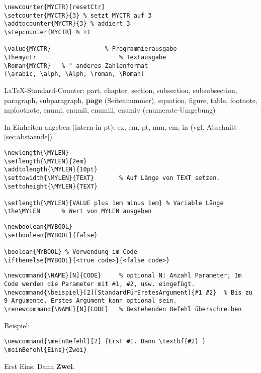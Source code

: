 
\columnbreak
{}



\negAbstand
\begin{lstlisting}
\newcounter{MYCTR}[resetCtr]
\setcounter{MYCTR}{3} % setzt MYCTR auf 3
\addtocounter{MYCTR}{3} % addiert 3
\stepcounter{MYCTR}	% +1

\value{MYCTR}				% Programmierausgabe
\themyctr						% Textausgabe
\Roman{MYCTR}	% " anderes Zahlenformat 
(\arabic, \alph, \Alph, \roman, \Roman)
\end{lstlisting}
\LaTeX-Standard-Counter: part, chapter, section, subsection, subsubsection, paragraph, subparagraph, \textbf{page} (Seitennummer), equation, figure, table, footnote, mpfootnote, enumi, enumii, enumiii, enumiv (enumerate-Umgebung)

\bigskip


 \label{cha:Laengen}
In Einheiten angeben (intern in pt): ex, em, pt, mm, cm, in (vgl. Abschnitt \ref{sec:abstaende})
\begin{lstlisting}
\newlength{\MYLEN}
\setlength{\MYLEN}{2em}
\addtolength{\MYLEN}{10pt}
\settowidth{\MYLEN}{TEXT}		% Auf Länge von TEXT setzen.
\settoheight{\MYLEN}{TEXT}	

\setlength{\MYLEN}{VALUE plus 1em minus 1em} % Variable Länge
\the\MYLEN		% Wert von MYLEN ausgeben
\end{lstlisting}


\begin{lstlisting}
\newboolean{MYBOOL}
\setboolean{MYBOOL}{false}

\boolean{MYBOOL} % Verwendung im Code
\ifthenelse{MYBOOL}{<true code>}{<false code>}
\end{lstlisting}


\vspace{-0.5\baselineskip}
\begin{lstlisting}
\newcommand{\NAME}[N]{CODE} 	% optional N: Anzahl Parameter; Im Code werden die Parameter mit #1, #2, usw. eingefügt.
\newcommand{\beispiel}[2][StandardFürErstesArgument]{#1 #2}  % Bis zu 9 Argumente. Erstes Argument kann optional sein.
\renewcommand{\NAME}[N]{CODE}	% Bestehenden Befehl überschreiben
\end{lstlisting}
Beispiel:
\begin{lstlisting}
\newcommand{\meinBefehl}[2] {Erst #1. Dann \textbf{#2} }
\meinBefehl{Eins}{Zwei}
\end{lstlisting}
\newcommand{\meinBefehl}[2] {Erst #1. Dann \textbf{#2}. }
\hspace{2em} \meinBefehl{Eins}{Zwei}

